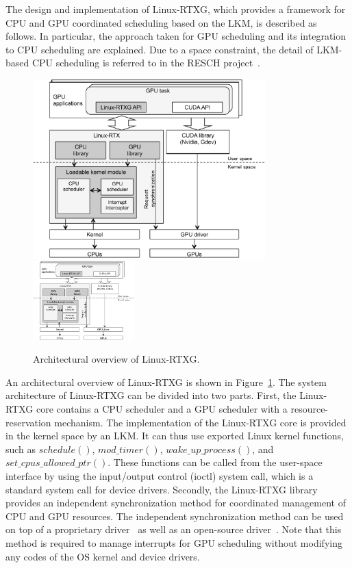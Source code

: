 \label{sec:design_imple}
The design and implementation of Linux-RTXG, which provides a framework for CPU and GPU coordinated scheduling based on the LKM, is described as follows.
In particular, the approach taken for GPU scheduling and its integration to CPU scheduling are explained.
Due to a space constraint, the detail of LKM-based CPU scheduling is referred to in the RESCH project~\cite{kato2009loadable, asberg2012exsched}.


\begin{figure}[t]
\begin{center}
\ifthesis
\includegraphics[width=0.8\textwidth]{img/overview.pdf}
\else
\includegraphics[width=0.35\textwidth]{img/overview.pdf}
\fi
\caption{Architectural overview of Linux-RTXG.}
\vspace{-4mm}
\label{fig:overview}
\end{center}
\end{figure}

An architectural overview of Linux-RTXG is shown in Figure~\ref{fig:overview}.
The system architecture of Linux-RTXG can be divided into two parts.
First, the Linux-RTXG core contains a CPU scheduler and a GPU scheduler with a resource-reservation mechanism.
The implementation of the Linux-RTXG core is provided in the kernel space by an LKM.
It can thus use exported Linux kernel functions, such as $schedule()$, $mod\_timer()$, $wake\_up\_process()$, and $set\_cpus\_allowed\_ptr()$.
These functions can be called from the user-space interface by using the input/output control (ioctl) system call, which is a standard system call for device drivers.
Secondly, the Linux-RTXG library provides an independent synchronization method for coordinated management of CPU and GPU resources.
The independent synchronization method can be used on top of a proprietary driver~\cite{nvidia:cuda_zone} as well as an open-source driver~\cite{nouveau}.
Note that this method is required to manage interrupts for GPU scheduling without modifying any codes of the OS kernel and device drivers.

